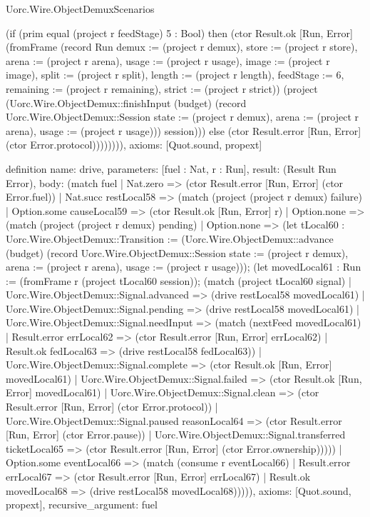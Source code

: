 \begin{lexlean}{Uorc.Wire.ObjectDemuxScenarios}
\begin{semanticmodule}
{(if (prim equal (project r feedStage) 5 : Bool) then (ctor Result.ok [Run, Error] (fromFrame (record Run {demux := (project r demux), store := (project r store), arena := (project r arena), usage := (project r usage), image := (project r image), split := (project r split), length := (project r length), feedStage := 6, remaining := (project r remaining), strict := (project r strict)}) (project (Uorc.Wire.ObjectDemux::finishInput (budget) (record Uorc.Wire.ObjectDemux::Session {state := (project r demux), arena := (project r arena), usage := (project r usage)})) session))) else (ctor Result.error [Run, Error] (ctor Error.protocol)))))))),
  axioms: [Quot.sound, propext]
}

definition{
  name: drive,
  parameters: [fuel : Nat, r : Run],
  result: (Result Run Error),
  body: (match fuel
    | Nat.zero => (ctor Result.error [Run, Error] (ctor Error.fuel))
    | Nat.succ restLocal58 => (match (project (project r demux) failure)
      | Option.some causeLocal59 => (ctor Result.ok [Run, Error] r)
      | Option.none => (match (project (project r demux) pending)
        | Option.none => (let tLocal60 : Uorc.Wire.ObjectDemux::Transition := (Uorc.Wire.ObjectDemux::advance (budget) (record Uorc.Wire.ObjectDemux::Session {state := (project r demux), arena := (project r arena), usage := (project r usage)})); (let movedLocal61 : Run := (fromFrame r (project tLocal60 session)); (match (project tLocal60 signal)
          | Uorc.Wire.ObjectDemux::Signal.advanced => (drive restLocal58 movedLocal61)
          | Uorc.Wire.ObjectDemux::Signal.pending => (drive restLocal58 movedLocal61)
          | Uorc.Wire.ObjectDemux::Signal.needInput => (match (nextFeed movedLocal61)
            | Result.error errLocal62 => (ctor Result.error [Run, Error] errLocal62)
            | Result.ok fedLocal63 => (drive restLocal58 fedLocal63))
          | Uorc.Wire.ObjectDemux::Signal.complete => (ctor Result.ok [Run, Error] movedLocal61)
          | Uorc.Wire.ObjectDemux::Signal.failed => (ctor Result.ok [Run, Error] movedLocal61)
          | Uorc.Wire.ObjectDemux::Signal.clean => (ctor Result.error [Run, Error] (ctor Error.protocol))
          | Uorc.Wire.ObjectDemux::Signal.paused reasonLocal64 => (ctor Result.error [Run, Error] (ctor Error.pause))
          | Uorc.Wire.ObjectDemux::Signal.transferred ticketLocal65 => (ctor Result.error [Run, Error] (ctor Error.ownership)))))
        | Option.some eventLocal66 => (match (consume r eventLocal66)
          | Result.error errLocal67 => (ctor Result.error [Run, Error] errLocal67)
          | Result.ok movedLocal68 => (drive restLocal58 movedLocal68))))),
  axioms: [Quot.sound, propext],
  recursive_argument: fuel
}


\end{semanticmodule}
\end{lexlean}
